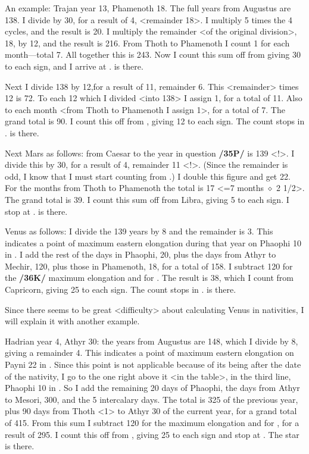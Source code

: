 An example: Trajan year 13, Phamenoth 18. The full years from Augustus are 138. I divide by 30,
for a result of 4, <remainder 18>. I multiply 5 times the 4 cycles, and the result is 20. I multiply the remainder <of the original division>, 18, by 12, and the result is 216. From Thoth to Phamenoth I count 1 for each month—total 7. All together this is 243. Now I count this sum off from \Cancer\xspace giving 30 to each sign, and I arrive at \Pisces. \Saturn\xspace is there.

Next I divide 138 by 12,for a result of 11, remainder 6. This <remainder> times 12 is 72. To each 12 which I divided <into 138> I assign 1, for a total of 11. Also to each month <from Thoth to Phamenoth I assign 1>, for a total of 7. The grand total is 90. I count this off from \Taurus, giving 12 to
each sign. The count stops in \Sagittarius. \Jupiter\xspace is there. 

Next Mars as follows: from Caesar to the year in question \textbf{/35P/} is 139 <!>. I divide this by 30, for a
result of 4, remainder 11 <!>. (Since the remainder is odd, I know that I must start counting from \Libra.) I double this figure and get 22. For the months from Thoth to Phamenoth the total is 17 <=7 months $\diamond$ 2 1/2>. The grand total is 39. I count this sum off from Libra, giving 5 to each sign. I stop at \Taurus. \Mars\xspace is there.

Venus as follows: I divide the 139 years by 8 and the remainder is 3. This indicates a point of maximum eastern elongation during that year on Phaophi 10 in \Sagittarius. I add the rest of the days in Phaophi, 20, plus the days from Athyr to Mechir, 120, plus those in Phamenoth, 18, for a total of 158. I subtract 120 for the \textbf{/36K/} maximum elongation and for \Sagittarius. The result is 38, which I count from Capricorn, giving 25 to each sign. The count stops in \Aquarius. \Venus\xspace is there.

Since there seems to be great <difficulty> about calculating Venus in nativities, I will explain it with another example. 

Hadrian year 4, Athyr 30: the years from Augustus are 148, which I divide by 8, giving a remainder 4. This indicates a point of maximum eastern elongation on Payni 22 in \Leo. Since this point is not applicable because of its being after the date of the nativity, I go to the one right above it <in
the table>, in the third line, Phaophi 10 in \Sagittarius. So I add the remaining 20 days of Phaophi, the days from Athyr to Mesori, 300, and the 5 intercalary days. The total is 325 of the previous year, plus 90 days from Thoth <1> to Athyr 30 of the current year, for a grand total of 415. From this sum I subtract 120 for the maximum elongation and for \Sagittarius, for a result of 295. I count this off from \Capricorn,
giving 25 to each sign and stop at \Sagittarius\xspace 20. The star is there.

